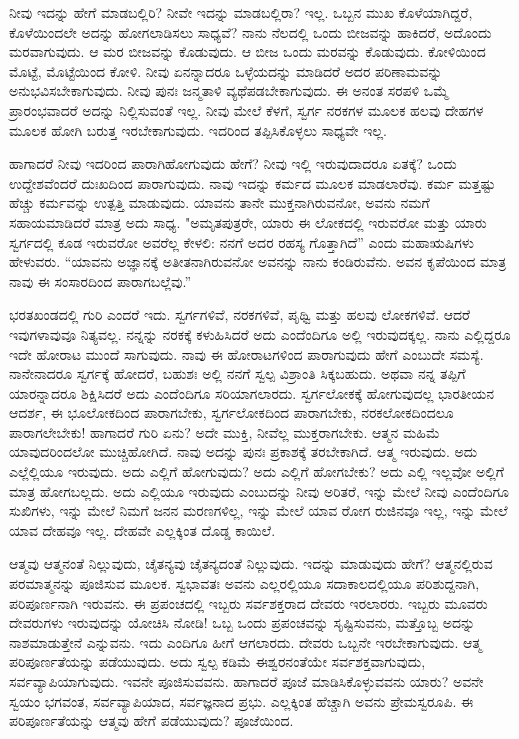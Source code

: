 ನೀವು ಇದನ್ನು ಹೇಗೆ ಮಾಡಬಲ್ಲಿರಿ? ನೀವೇ ಇದನ್ನು ಮಾಡಬಲ್ಲಿರಾ? ಇಲ್ಲ. ಒಬ್ಬನ ಮುಖ ಕೊಳೆಯಾಗಿದ್ದರೆ, ಕೊಳೆಯಿಂದಲೇ ಅದನ್ನು ಹೋಗಲಾಡಿಸಲು ಸಾಧ್ಯವೆ? ನಾನು ನೆಲದಲ್ಲಿ ಒಂದು ಬೀಜವನ್ನು ಹಾಕಿದರೆ, ಅದೊಂದು ಮರವಾಗುವುದು. ಆ ಮರ ಬೀಜವನ್ನು ಕೊಡುವುದು. ಆ ಬೀಜ ಒಂದು ಮರವನ್ನು ಕೊಡುವುದು. ಕೋಳಿಯಿಂದ ಮೊಟ್ಟೆ, ಮೊಟ್ಟೆಯಿಂದ ಕೋಳಿ. ನೀವು ಏನನ್ನಾದರೂ ಒಳ್ಳೆಯದನ್ನು ಮಾಡಿದರೆ ಅದರ ಪರಿಣಾಮವನ್ನು ಅನುಭವಿಸಬೇಕಾಗುವುದು. ನೀವು ಪುನಃ ಜನ್ಮತಾಳಿ ವ್ಯಥೆಪಡಬೇಕಾಗುವುದು. ಈ ಅನಂತ ಸರಪಳಿ ಒಮ್ಮೆ ಪ್ರಾರಂಭವಾದರೆ ಅದನ್ನು ನಿಲ್ಲಿಸುವಂತೆ ಇಲ್ಲ. ನೀವು ಮೇಲೆ ಕೆಳಗೆ, ಸ್ವರ್ಗ ನರಕಗಳ ಮೂಲಕ ಹಲವು ದೇಹಗಳ ಮೂಲಕ ಹೋಗಿ ಬರುತ್ತ ಇರಬೇಕಾಗುವುದು. ಇದರಿಂದ ತಪ್ಪಿಸಿಕೊಳ್ಳಲು ಸಾಧ್ಯವೇ ಇಲ್ಲ.

ಹಾಗಾದರೆ ನೀವು ಇದರಿಂದ ಪಾರಾಗಿಹೋಗುವುದು ಹೇಗೆ? ನೀವು ಇಲ್ಲಿ ಇರುವುದಾದರೂ ಏತಕ್ಕೆ? ಒಂದು ಉದ್ದೇಶವೆಂದರೆ ದುಃಖದಿಂದ ಪಾರಾಗುವುದು. ನಾವು ಇದನ್ನು ಕರ್ಮದ ಮೂಲಕ ಮಾಡಲಾರೆವು. ಕರ್ಮ ಮತ್ತಷ್ಟು ಹೆಚ್ಚು ಕರ್ಮವನ್ನು ಉತ್ಪತ್ತಿ ಮಾಡುವುದು. ಯಾವನು ತಾನೇ ಮುಕ್ತನಾಗಿರುವನೋ, ಅವನು ನಮಗೆ ಸಹಾಯಮಾಡಿದರೆ ಮಾತ್ರ ಅದು ಸಾಧ್ಯ. "ಅಮೃತಪುತ್ರರೇ, ಯಾರು ಈ ಲೋಕದಲ್ಲಿ ಇರುವರೋ ಮತ್ತು ಯಾರು ಸ್ವರ್ಗದಲ್ಲಿ ಕೂಡ ಇರುವರೋ ಅವರೆಲ್ಲ ಕೇಳಲಿ: ನನಗೆ ಅದರ ರಹಸ್ಯ ಗೊತ್ತಾಗಿದೆ'' ಎಂದು ಮಹಾಋಷಿಗಳು ಹೇಳುವರು. “ಯಾವನು ಅಜ್ಞಾನಕ್ಕೆ ಅತೀತನಾಗಿರುವನೋ ಅವನನ್ನು ನಾನು ಕಂಡಿರುವೆನು. ಅವನ ಕೃಪೆಯಿಂದ ಮಾತ್ರ ನಾವು ಈ ಸಂಸಾರದಿಂದ ಪಾರಾಗಬಲ್ಲೆವು.”

ಭರತಖಂಡದಲ್ಲಿ ಗುರಿ ಎಂದರೆ ಇದು. ಸ್ವರ್ಗಗಳಿವೆ, ನರಕಗಳಿವೆ, ಪೃಥ್ವಿ ಮತ್ತು ಹಲವು ಲೋಕಗಳಿವೆ. ಆದರೆ ಇವುಗಳಾವುವೂ ನಿತ್ಯವಲ್ಲ. ನನ್ನನ್ನು ನರಕಕ್ಕೆ ಕಳುಹಿಸಿದರೆ ಅದು ಎಂದೆಂದಿಗೂ ಅಲ್ಲಿ ಇರುವುದಕ್ಕಲ್ಲ. ನಾನು ಎಲ್ಲಿದ್ದರೂ ಇದೇ ಹೋರಾಟ ಮುಂದೆ ಸಾಗುವುದು. ನಾವು ಈ ಹೋರಾಟಗಳಿಂದ ಪಾರಾಗುವುದು ಹೇಗೆ ಎಂಬುದೇ ಸಮಸ್ಯೆ. ನಾನೇನಾದರೂ ಸ್ವರ್ಗಕ್ಕೆ ಹೋದರೆ, ಬಹುಶಃ ಅಲ್ಲಿ ನನಗೆ ಸ್ವಲ್ಪ ವಿಶ್ರಾಂತಿ ಸಿಕ್ಕಬಹುದು. ಅಥವಾ ನನ್ನ ತಪ್ಪಿಗೆ ಯಾರನ್ನಾದರೂ ಶಿಕ್ಷಿಸಿದರೆ ಅದು ಎಂದೆಂದಿಗೂ ಸರಿಯಾಗಲಾರದು. ಸ್ವರ್ಗಲೋಕಕ್ಕೆ ಹೋಗುವುದಲ್ಲ ಭಾರತೀಯನ ಆದರ್ಶ, ಈ ಭೂಲೋಕದಿಂದ ಪಾರಾಗಬೇಕು, ಸ್ವರ್ಗಲೋಕದಿಂದ ಪಾರಾಗಬೇಕು, ನರಕಲೋಕದಿಂದಲೂ ಪಾರಾಗಲೇಬೇಕು! ಹಾಗಾದರೆ ಗುರಿ ಏನು? ಅದೇ ಮುಕ್ತಿ, ನೀವೆಲ್ಲ ಮುಕ್ತರಾಗಬೇಕು. ಆತ್ಮನ ಮಹಿಮೆ ಯಾವುದರಿಂದಲೋ ಮುಚ್ಚಿಹೋಗಿದೆ. ನಾವು ಅದನ್ನು ಪುನಃ ಪ್ರಕಾಶಕ್ಕೆ ತರಬೇಕಾಗಿದೆ. ಆತ್ಮ ಇರುವುದು. ಅದು ಎಲ್ಲೆಲ್ಲಿಯೂ ಇರುವುದು. ಅದು ಎಲ್ಲಿಗೆ ಹೋಗುವುದು? ಅದು ಎಲ್ಲಿಗೆ ಹೋಗಬೇಕು? ಅದು ಎಲ್ಲಿ ಇಲ್ಲವೋ ಅಲ್ಲಿಗೆ ಮಾತ್ರ ಹೋಗಬಲ್ಲದು. ಅದು ಎಲ್ಲಿಯೂ ಇರುವುದು ಎಂಬುದನ್ನು ನೀವು ಅರಿತರೆ, ಇನ್ನು ಮೇಲೆ ನೀವು ಎಂದೆಂದಿಗೂ ಸುಖಿಗಳು, ಇನ್ನು ಮೇಲೆ ನಿಮಗೆ ಜನನ ಮರಣಗಳಿಲ್ಲ, ಇನ್ನು ಮೇಲೆ ಯಾವ ರೋಗ ರುಜಿನವೂ ಇಲ್ಲ, ಇನ್ನು ಮೇಲೆ ಯಾವ ದೇಹವೂ ಇಲ್ಲ. ದೇಹವೇ ಎಲ್ಲಕ್ಕಿಂತ ದೊಡ್ಡ ಕಾಯಿಲೆ.

ಆತ್ಮವು ಆತ್ಮನಂತೆ ನಿಲ್ಲುವುದು, ಚೈತನ್ಯವು ಚೈತನ್ಯದಂತೆ ನಿಲ್ಲುವುದು. ಇದನ್ನು ಮಾಡುವುದು ಹೇಗೆ? ಆತ್ಮನಲ್ಲಿರುವ ಪರಮಾತ್ಮನನ್ನು ಪೂಜಿಸುವ ಮೂಲಕ. ಸ್ವಭಾವತಃ ಅವನು ಎಲ್ಲರಲ್ಲಿಯೂ ಸದಾಕಾಲದಲ್ಲಿಯೂ ಪರಿಶುದ್ದನಾಗಿ, ಪರಿಪೂರ್ಣನಾಗಿ ಇರುವನು. ಈ ಪ್ರಪಂಚದಲ್ಲಿ ಇಬ್ಬರು ಸರ್ವಶಕ್ತರಾದ ದೇವರು ಇರಲಾರರು. ಇಬ್ಬರು ಮೂವರು ದೇವರುಗಳು ಇರುವುದನ್ನು ಯೋಚಿಸಿ ನೋಡಿ! ಒಬ್ಬ ಒಂದು ಪ್ರಪಂಚವನ್ನು ಸೃಷ್ಟಿಸುವನು, ಮತ್ತೊಬ್ಬ ಅದನ್ನು ನಾಶಮಾಡುತ್ತೇನೆ ಎನ್ನುವನು. ಇದು ಎಂದಿಗೂ ಹೀಗೆ ಆಗಲಾರದು. ದೇವರು ಒಬ್ಬನೇ ಇರಬೇಕಾಗುವುದು. ಆತ್ಮ ಪರಿಪೂರ್ಣತೆಯನ್ನು ಪಡೆಯುವುದು. ಅದು ಸ್ವಲ್ಪ ಕಡಿಮೆ ಈಶ್ವರನಂತೆಯೇ ಸರ್ವಶಕ್ತವಾಗುವುದು, ಸರ್ವವ್ಯಾಪಿಯಾಗುವುದು. ಇವನೇ ಪೂಜಿಸುವವನು. ಹಾಗಾದರೆ ಪೂಜೆ ಮಾಡಿಸಿಕೊಳ್ಳುವವನು ಯಾರು? ಅವನೇ ಸ್ವಯಂ ಭಗವಂತ, ಸರ್ವವ್ಯಾಪಿಯಾದ, ಸರ್ವಜ್ಞನಾದ ಪ್ರಭು. ಎಲ್ಲಕ್ಕಿಂತ ಹೆಚ್ಚಾಗಿ ಅವನು ಪ್ರೇಮಸ್ವರೂಪಿ. ಈ ಪರಿಪೂರ್ಣತೆಯನ್ನು ಆತ್ಮವು ಹೇಗೆ ಪಡೆಯುವುದು? ಪೂಜೆಯಿಂದ.

